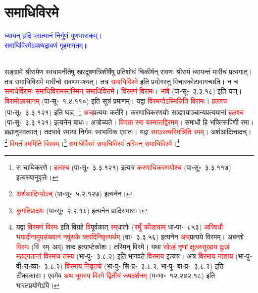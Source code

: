 \section[समाधिविरमे]{समाधिविरमे}
\centering\textcolor{blue}{ध्यायन् हृदि परात्मानं निर्गुणं गुणभासकम्।\nopagebreak\\
समाधिविरमेऽपश्यद्रावणं गृहमागतम्॥}\nopagebreak\\
\\
\begin{sloppypar}\justifying\noindent\hspace{10mm} सङ्ग्रामे श्रीरामेण स्वधामनीतेषु खर\-दूषण\-त्रिशीर्षेषु प्रतिशोधं चिकीर्षन् रावणः श्रीरामं ध्यायन्तं मारीचं प्रत्यगात्। तत्र समाधि\-विरामे मारीचो रावणमपश्यत्। तत्र \textcolor{red}{समाधि\-विरमे} इति प्रयोगस्तु विचारकोटावागच्छति। न च \textcolor{red}{समाधेर्विरामः समाधि\-विरामस्तस्मिन् समाधि\-विरामे}। \textcolor{red}{विरमणं विरामः}। \textcolor{red}{भावे} (पा॰सू॰~३.३.१८) इति घञ्। \textcolor{red}{विरामोऽवसानम्} (पा॰सू॰~१.४.११०) इति सूत्रं प्रमाणम्। यद्वा \textcolor{red}{विरमन्तेऽस्मिन्निति विरामः}। \textcolor{red}{हलश्च} (पा॰सू॰~३.३.१२१) इति घञ्।\footnote{स चाधिकरणे। \textcolor{red}{हलश्च} (पा॰सू॰~३.३.१२१) इत्यत्र \textcolor{red}{करणाधिकरणयोश्च} (पा॰सू॰~३.३.११७) इत्यस्यानुवृत्तेः।} \textcolor{red}{अच्‌}\-प्रत्ययः कर्तरि। करणाधि\-करणयोः सञ्ज्ञायाञ्चान्य\-प्रत्ययानां \textcolor{red}{हलश्च} (पा॰सू॰~३.३.१२१) इत्यनेन बाधः। अत्रोच्यते। \textcolor{red}{विगता रमा यस्मात्तद्विरमम्}। समाधौ हि भक्ति\-रूपिणी रमा। ब्रह्मानुभवत्वात्। तदभावे रमाया निर्गमः स्वभाविक एवातः। यद्वा \textcolor{red}{रमाऽस्त्यस्मिन्निति रमम्}। अर्शआदित्वादच्।\footnote{\textcolor{red}{अर्शआदिभ्योऽच्} (पा॰सू॰~५.२.१२७) इत्यनेन।} \textcolor{red}{विगतं रममिति विरमम्}।\footnote{\textcolor{red}{कु\-गति\-प्रादयः} (पा॰सू॰~२.२.१८) इत्यनेन प्रादि\-समासः।} \textcolor{red}{समाधेर्विरमं समाधि\-विरमं तस्मिन् समाधि\-विरमे}।\footnote{यद्वा \textcolor{red}{विरमणं विरमः} इति विग्रहे \textcolor{red}{वि}\-पूर्वकात् \textcolor{red}{रम्‌}\-धातोः (\textcolor{red}{रमुँ क्रीडायाम्} धा॰पा॰~८५३) \textcolor{red}{अज्विधौ भयादीनामुपसंख्यानं नपुंसके क्तादिनिवृत्त्यर्थम्} (वा॰~३.३.५६) इत्यनेन \textcolor{red}{अच्‌}\-प्रत्यये विरमम्। अबन्तो \textcolor{red}{विरमः} (वि~रम्~अप्) शब्द इत्याप्टे\-कोशः। तस्मिन् विरमे। यथा \textcolor{red}{सोऽहं नृणां क्षुल्लसुखाय दुःखं महद्गतानां विरमाय तस्य} (भा॰पु॰~३.८.२) इति भागवते \textcolor{red}{विरमाय} इत्यत्र। अत्र \textcolor{red}{विरमाय नाशाय} (भा॰पु॰ वी॰रा॰व्या॰~३.८.२) \textcolor{red}{विरमाय निवृत्तये} (भा॰पु॰ सि॰प्र॰~३.८.२, भा॰पु॰ बा॰प्र॰~३.८.२) इति टीकाकाराः। एवमेव \textcolor{red}{अथ धूमस्य विरमे द्वितीयं रूपदर्शनम्} (म॰भा॰~१२.२४२.१८) इति भारत\-प्रयोगेऽपि।}\end{sloppypar}
